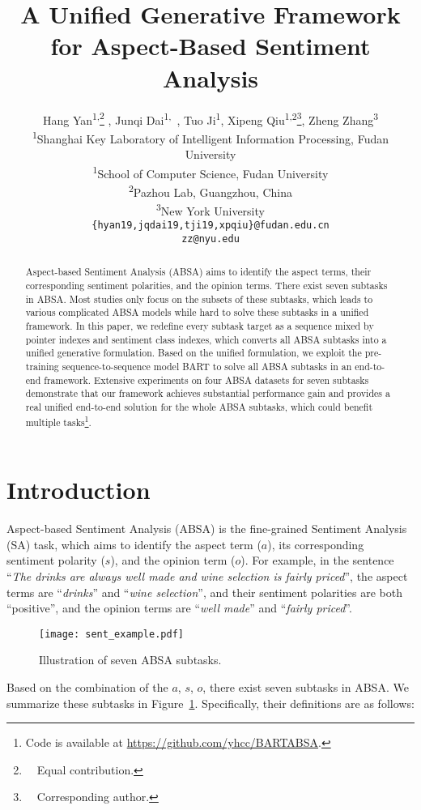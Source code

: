 \documentclass[11pt,a4paper]{article}
\title{A Unified Generative Framework for Aspect-Based Sentiment Analysis
}
\author{Hang Yan\textsuperscript{1,}\thanks{\ \  Equal contribution.} , Junqi Dai\textsuperscript{1,}\samethanks \ , Tuo Ji\textsuperscript{1}, Xipeng Qiu\textsuperscript{1,2}\thanks{\ \  Corresponding author.}, Zheng Zhang\textsuperscript{3}\\
  \textsuperscript{1}Shanghai Key Laboratory of Intelligent Information Processing, Fudan University \\
  \textsuperscript{1}School of Computer Science, Fudan University \\
  \textsuperscript{2}Pazhou Lab, Guangzhou, China \\
  \textsuperscript{3}New York University \\
  \texttt{\{hyan19,jqdai19,tji19,xpqiu\}@fudan.edu.cn}\\
  \texttt{zz@nyu.edu}\\}
\date{}
\begin{document}
\maketitle
\begin{abstract}
  Aspect-based Sentiment Analysis (ABSA) aims to identify the aspect terms, their corresponding sentiment polarities, and the opinion terms. There exist seven subtasks in ABSA. Most studies only focus on the subsets of these subtasks, which leads to various complicated ABSA models while hard to solve these subtasks in a unified framework. In this paper,  we redefine every subtask target as a sequence mixed by pointer indexes and sentiment class indexes, which converts all ABSA subtasks into a unified generative formulation. Based on the unified formulation, we exploit the pre-training sequence-to-sequence model BART to solve all ABSA subtasks in an end-to-end framework. Extensive experiments on four ABSA datasets for seven subtasks demonstrate that our framework achieves substantial performance gain and provides a real unified end-to-end solution for the whole ABSA subtasks, which could benefit multiple tasks\footnote{Code is available at \url{https://github.com/yhcc/BARTABSA}.}. \end{abstract}






\section{Introduction}
Aspect-based Sentiment Analysis (ABSA) is the fine-grained Sentiment Analysis (SA) task, which aims to identify the aspect term ($a$), its corresponding sentiment polarity ($s$),   and the opinion term ($o$).
For example, in the sentence ``\textit{The \textcolor[rgb]{1.00,0.00,0.00}{drinks} are always \textcolor[RGB]{101,139,243}{well made} and \textcolor[rgb]{1.00,0.00,0.00}{wine selection} is \textcolor[RGB]{101,139,243}{fairly priced}}'', the aspect terms are ``\textit{\textcolor[rgb]{1.00,0.00,0.00}{drinks}}'' and ``\textit{\textcolor[rgb]{1.00,0.00,0.00}{wine selection}}'', and their sentiment polarities  are both ``\textcolor[RGB]{0, 176, 80}{positive}'', and the opinion terms are  ``\textit{\textcolor[RGB]{101,139,243}{well made}}'' and ``\textit{\textcolor[RGB]{101,139,243}{fairly priced}}''.
\begin{figure}[t]
  \texttt{[image: sent\_example.pdf]}
  \caption{Illustration of seven ABSA subtasks.
}\label{fig:sent_example}
\end{figure}
Based on the combination of the $a$, $s$, $o$, there exist seven subtasks in ABSA. We summarize these subtasks in Figure~\ref{fig:sent_example}. Specifically, their definitions are  as follows:
\end{document}
